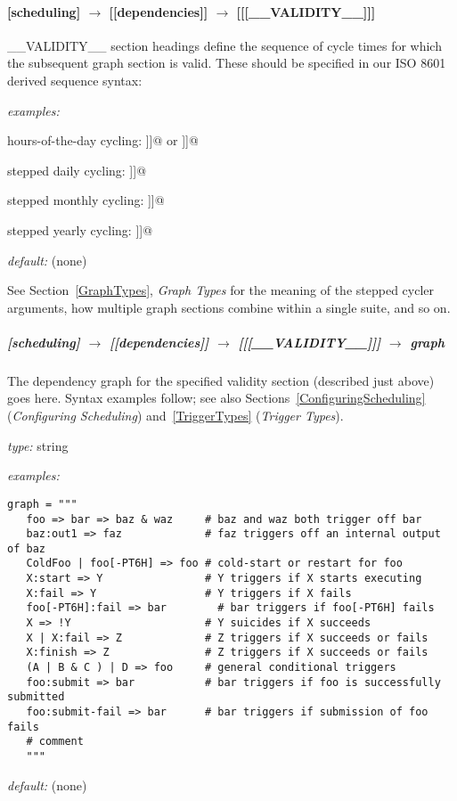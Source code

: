 \paragraph[{[[[}\_\_VALIDITY\_\_{]]]}]{[scheduling] $\rightarrow$ [[dependencies]] $\rightarrow$ [[[\_\_VALIDITY\_\_]]]}

\_\_VALIDITY\_\_ section headings define the sequence of cycle times for
which the subsequent graph section is valid. These should be specified in
our ISO 8601 derived sequence syntax:
\begin{myitemize}
    \item {\em examples:}
        \begin{myitemize}
            \item hours-of-the-day cycling: \lstinline@[[[T00,T06,T12,T18]]]@ or \lstinline@[[[ PT6H ]]]@
            \item stepped daily cycling: \lstinline@[[[P1D]]]@
            \item stepped monthly cycling: \lstinline@[[[P2M]]]@
            \item stepped yearly cycling: \lstinline@[[[P3Y]]]@
        \end{myitemize}
    \item {\em default:} (none)
\end{myitemize}

See Section~\ref{GraphTypes}, {\em Graph Types} for the meaning of the
stepped cycler arguments, how multiple graph sections combine within a
single suite, and so on.

\subparagraph[graph]{[scheduling] $\rightarrow$ [[dependencies]] $\rightarrow$ [[[\_\_VALIDITY\_\_]]] $\rightarrow$ graph }
\label{GraphDescrip}

The dependency graph for the specified validity section (described just
above) goes here. Syntax examples follow; see also
Sections~\ref{ConfiguringScheduling} ({\em Configuring Scheduling})
and~\ref{TriggerTypes} ({\em Trigger Types}).

\begin{myitemize}
\item {\em type:} string
\item {\em examples:}
  \begin{lstlisting}
graph = """
   foo => bar => baz & waz     # baz and waz both trigger off bar
   baz:out1 => faz             # faz triggers off an internal output of baz
   ColdFoo | foo[-PT6H] => foo # cold-start or restart for foo
   X:start => Y                # Y triggers if X starts executing
   X:fail => Y                 # Y triggers if X fails
   foo[-PT6H]:fail => bar        # bar triggers if foo[-PT6H] fails
   X => !Y                     # Y suicides if X succeeds
   X | X:fail => Z             # Z triggers if X succeeds or fails
   X:finish => Z               # Z triggers if X succeeds or fails
   (A | B & C ) | D => foo     # general conditional triggers
   foo:submit => bar           # bar triggers if foo is successfully submitted
   foo:submit-fail => bar      # bar triggers if submission of foo fails
   # comment
   """
  \end{lstlisting}
\item {\em default:} (none)
\end{myitemize}

